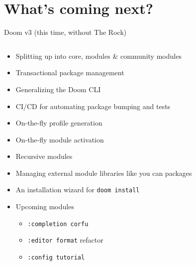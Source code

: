 \documentclass[presentation, t]{beamer}
\begin{document}
\section{What's coming next?}
\label{sec:orgab8906d}
\begin{frame}[label={sec:orgbfeea96},fragile]{Doom v3 (this time, without The Rock)}
 \vspace*{-30pt}
\footnotesize
\begin{columns}
\begin{column}{0.8\columnwidth}
\begin{block}{}
\begin{itemize}
\item Splitting up into core, modules \& community modules
\item Transactional package management
\item Generalizing the Doom CLI
\item CI/CD for automating package bumping and tests
\item On-the-fly profile generation
\item On-the-fly module activation
\item Recursive modules
\item Managing external module libraries like you can packages
\item An installation wizard for \texttt{doom install}
\item Upcoming modules
\begin{itemize}
\item \texttt{:completion corfu}
\item \texttt{:editor format} refactor
\item \texttt{:config tutorial}
\end{itemize}
\end{itemize}
\end{block}
\end{column}


\end{columns}
\end{frame}
\end{document}
